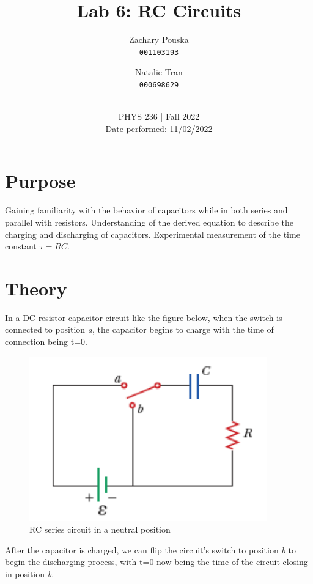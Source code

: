 \documentclass[titlepage]{article}
\begin{document}
\title{\textbf{Lab 6: RC Circuits}}
\author{
    Zachary Pouska\\
    \texttt{001103193}\\
    \and
    Natalie Tran \\ 
    \texttt{000698629}\\ \\
} 

\date{PHYS 236 | Fall 2022\\
Date performed: 11/02/2022}


	\maketitle



	\section{Purpose}
    Gaining familiarity with the behavior of capacitors while in both series and parallel with resistors. Understanding of the derived equation to describe the charging and discharging of capacitors. Experimental measurement of the time constant $\tau=RC$.


	\section{Theory}	
    In a DC resistor-capacitor circuit like the figure below, when the switch is connected to position \emph{a}, the capacitor begins to charge with the time of connection being t=0.

    \FloatBarrier
    \begin{figure}[hbt!]
        \centering
        \caption{RC series circuit in a neutral position}
        \includegraphics[scale=0.3]{images/theory/circuit.png}
    \end{figure}
    \FloatBarrier
    After the capacitor is charged, we can flip the circuit's switch to position \emph{b} to begin the discharging process, with t=0 now being the time of the circuit closing in position \emph{b}.
\end{document}
